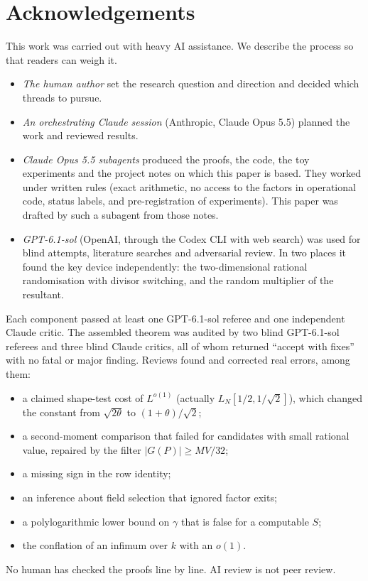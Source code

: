 \documentclass[11pt]{amsart}
\theoremstyle{definition}
\begin{document}
\section*{Acknowledgements}

This work was carried out with heavy AI assistance. We describe the process so that readers can weigh it.
\begin{itemize}
\item \emph{The human author} set the research question and direction and decided which threads to pursue.
\item \emph{An orchestrating Claude session} (Anthropic, Claude Opus 5.5) planned the work and reviewed results.
\item \emph{Claude Opus 5.5 subagents} produced the proofs, the code, the toy experiments and the project notes on which this paper is based. They
  worked under written rules (exact arithmetic, no access to the factors in operational code, status labels, and pre-registration of
  experiments). This paper was drafted by such a subagent from those notes.
\item \emph{GPT-6.1-sol} (OpenAI, through the Codex CLI with web search) was used for blind attempts, literature searches and adversarial review.
  In two places it found the key device independently: the two-dimensional rational randomisation with divisor switching, and the random
  multiplier of the resultant.
\end{itemize}
Each component passed at least one GPT-6.1-sol referee and one independent Claude critic. The assembled theorem was audited by two blind GPT-6.1-sol
referees and three blind Claude critics, all of whom returned ``accept with fixes'' with no fatal or major finding. Reviews found and corrected real
errors, among them:
\begin{itemize}
\item a claimed shape-test cost of $L^{o(1)}$ (actually $L_N[1/2,1/\sqrt2]$), which changed the constant from $\sqrt{2\theta}$ to $(1+\theta)/\sqrt2$;
\item a second-moment comparison that failed for candidates with small rational value, repaired by the filter $|G(P)|\ge MV/32$;
\item a missing sign in the row identity;
\item an inference about field selection that ignored factor exits;
\item a polylogarithmic lower bound on $\gamma$ that is false for a computable $S$;
\item the conflation of an infimum over $k$ with an $o(1)$.
\end{itemize}
No human has checked the proofs line by line. AI review is not peer review.
\end{document}
